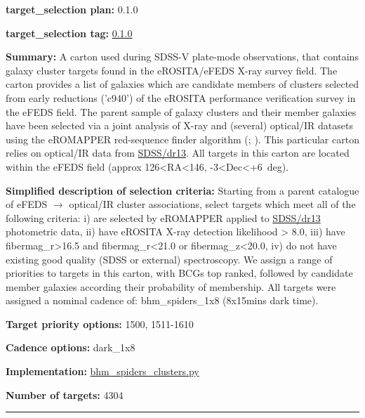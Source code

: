 \noindent\textbf{target\_selection plan:} 0.1.0

\noindent\textbf{target\_selection tag:}
\href{https://github.com/sdss/target_selection/tree/0.1.0/}{0.1.0}

\noindent\textbf{Summary:} A carton used during SDSS-V plate-mode observations,
that contains galaxy cluster targets found in the eROSITA/eFEDS X-ray
survey field. The carton provides a list of galaxies which are candidate
members of clusters selected from early reductions ('c940') of the
eROSITA performance verification survey in the eFEDS field. The parent
sample of galaxy clusters and their member galaxies have been selected
via a joint analysis of X-ray and (several) optical/IR datasets using
the eROMAPPER red-sequence finder algorithm
(\citealt{Rykoff2014};
\citealt{IderChitham2020}). This particular carton relies on optical/IR data
from \href{https://www.sdss.org/dr13/}{SDSS/dr13}. All targets in this
carton are located within the eFEDS field (approx
126\textless{}RA\textless{}146, -3\textless{}Dec\textless{}+6~deg).

\noindent\textbf{Simplified description of selection criteria:} Starting from a
parent catalogue of eFEDS $\rightarrow$ optical/IR cluster associations, select
targets which meet all of the following criteria: i) are selected by
eROMAPPER applied to \href{https://www.sdss.org/dr13/}{SDSS/dr13}
photometric data, ii) have eROSITA X-ray detection likelihood
\textgreater{} 8.0, iii) have fibermag\_r\textgreater{}16.5 and
fibermag\_r\textless{}21.0 or fibermag\_z\textless{}20.0, iv) do not
have existing good quality (SDSS or external) spectroscopy. We assign a
range of priorities to targets in this carton, with BCGs top ranked,
followed by candidate member galaxies according their probability of
membership. All targets were assigned a nominal cadence of:
bhm\_spiders\_1x8 (8x15mins dark time).


\noindent\textbf{Target priority options:} 1500, 1511-1610

\noindent\textbf{Cadence options:} dark\_1x8

\noindent\textbf{Implementation:}
\href{https://github.com/sdss/target_selection/blob/0.1.0/python/target_selection/cartons/bhm_spiders_clusters.py}{bhm\_spiders\_clusters.py}

\noindent\textbf{Number of targets:} 4304

\begin{center}\rule{0.5\linewidth}{0.5pt}\end{center}

